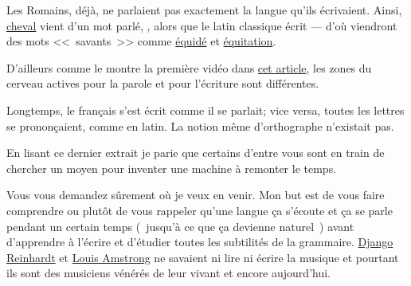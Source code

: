 
\begin{mdframed}[style=citestyle, frametitle={Extrait du livre \FL.}]
  Les Romains, déjà, ne parlaient pas exactement la langue qu'ils
  écrivaient. Ainsi, \underline{cheval} vient d'un mot parlé,
  , alors que le latin classique écrit  ---
  d'où viendront des mots <<~savants~>> comme \underline{équidé} et
  \underline{équitation}.
\end{mdframed}

D'ailleurs comme le montre la première vidéo dans
\href{http://doyouspeakenglish.fr/prescriptiviste-ou-descriptiviste/}{cet
  article}, les zones du cerveau actives pour la parole et pour l'écriture sont différentes.\par

\begin{mdframed}[style=citestyle, frametitle={Extrait du livre \FL.}]
  Longtemps, le français s'est écrit comme il se parlait; vice versa,
  toutes les lettres se prononçaient, comme en latin. La notion même
  d'orthographe n'existait pas.
\end{mdframed}

En lisant ce dernier extrait je parie que certains d'entre vous sont en train
de chercher un moyen pour inventer une machine à remonter le temps. 

Vous vous demandez sûrement où je veux en venir. Mon but est de vous
faire comprendre ou plutôt de vous rappeler qu'une langue ça s'écoute
et ça se parle pendant un certain temps (~jusqu'à ce que ça devienne
naturel~) avant d'apprendre à l'écrire et d'étudier toutes les
subtilités de la grammaire. \href{https://fr.wikipedia.org/wiki/Django\_Reinhardt}{Django Reinhardt} et \href{https://fr.wikipedia.org/wiki/Louis\_Armstrong}{Louis Amstrong} ne
savaient ni lire ni écrire la musique et pourtant ils sont des
musiciens vénérés de leur vivant et encore aujourd'hui.\par

